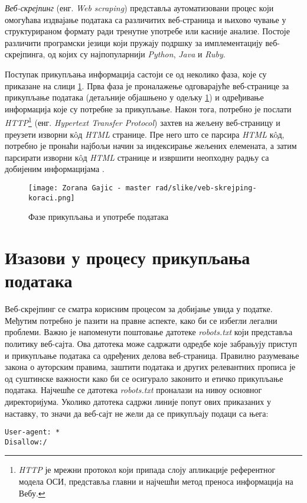 \documentclass[12pt,oneside]{memoir}
\begin{document}
\emph{Веб-скрејпинг} (енг. \textit{Web scraping}) представља аутоматизовани процес који омогућава издвајање података са различитих веб-страница и њихово чување у структурираном формату ради тренутне употребе или касније анализе. Постоје различити програмски језици који пружају подршку за имплементацију веб-скрејпинга, од којих су најпопуларнији \emph{Python}, \emph{Java} и \emph{Ruby}.

Поступак прикупљања информација састоји се од неколико фаза, које су приказане на слици  \ref{fig:web-scraping-steps}. Прва фаза је проналажење одговарајуће веб-странице за прикупљање података (детаљније објашњено у одељку \ref{chp:izazovi}) и одређивање информација које су потребне за прикупљање. Након тога, потребно је послати \emph{HTTP}\footnote{\textit{HTTP} је мрежни протокол који припада слоју апликације референтног модела ОСИ, представља главни и најчешћи метод преноса информација на Вебу.} (енг. \textit{Hypertext Transfer Protocol}) захтев на жељену веб-страницу и преузети изворни кôд \textit{HTML} странице. Пре него што се парсира \textit{HTML} кôд, потребно је пронаћи најбољи начин за индексирање жељених елемената, а затим парсирати изворни кôд \textit{HTML} странице и извршити неопходну радњу са добијеним информацијама \cite{EvalTools}.

\begin{figure}[!ht]
  \centering
  \texttt{[image: Zorana Gajic - master rad/slike/veb-skrejping-koraci.png]}
  \caption{Фазе прикупљања и употребе података}
  \label{fig:web-scraping-steps}
\end{figure}

\section{Изазови у процесу прикупљања података}
\label{chp:izazovi}

Веб-скрејпинг се сматра корисним процесом за добијање увида у податке. Међутим потребно је пазити на правне аспекте, како би се избегли легални проблеми. Важно је напоменути поштовање датотеке \textit{robots.txt} који представља политику веб-сајта. Ова датотека може садржати одредбе које забрањују приступ и прикупљање података са одређених делова веб-страница. 
Правилно разумевање закона о ауторским правима, заштити података и других релевантних прописа је од суштинске важности како би се осигурало законито и етичко прикупљање података. Најчешће се датотека \textit{robots.txt} проналази на нивоу основног директоријума. Уколико датотека садржи линије попут ових приказаних у наставку, то значи да веб-сајт не жели да се прикупљају подаци са њега:
\begin{verbatim}
User-agent: *
Disallow:/ 
\end{verbatim}
\end{document}
